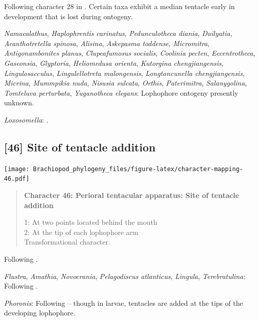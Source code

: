 \documentclass[openany]{book}
\begin{document}
Following character 28 in \citet{Carlson1995Phylogeneticrelationships}.
Certain taxa exhibit a median tentacle early in development that is lost
during ontogeny.

\hypertarget{Acanthotretella_spinosa-coding-45}{}
\emph{Namacalathus}, \emph{Haplophrentis carinatus},
\emph{Pedunculotheca diania}, \emph{Dailyatia}, \emph{Acanthotretella
spinosa}, \emph{Alisina}, \emph{Askepasma toddense}, \emph{Micromitra},
\emph{Antigonambonites planus}, \emph{Clupeafumosus socialis},
\emph{Coolinia pecten}, \emph{Eccentrotheca}, \emph{Gasconsia},
\emph{Glyptoria}, \emph{Heliomedusa orienta}, \emph{Kutorgina
chengjiangensis}, \emph{Lingulosacculus}, \emph{Lingulellotreta
malongensis}, \emph{Longtancunella chengjiangensis}, \emph{Micrina},
\emph{Mummpikia nuda}, \emph{Nisusia sulcata}, \emph{Orthis},
\emph{Paterimitra}, \emph{Salanygolina}, \emph{Tomteluva perturbata},
\emph{Yuganotheca elegans}: Lophophore ontogeny presently unknown.

\hypertarget{Loxosomella-coding-45}{}
\emph{Loxosomella}: \citet{Nielsen1966}.

\subsection*{{[}46{]} Site of tentacle
addition}\label{site-of-tentacle-addition}

\texttt{[image: Brachiopod\_phylogeny\_files/figure-latex/character-mapping-46.pdf]}

\begin{quote}
\textbf{Character 46: Perioral tentacular apparatus: Site of tentacle
addition}

1: At two points located behind the mouth\\
2: At the tip of each lophophore arm\\
Transformational character.
\end{quote}

Following \citet{Temereva2017Innervationof}.

\hypertarget{Amathia-coding-46}{}
\emph{Flustra}, \emph{Amathia}, \emph{Novocrania}, \emph{Pelagodiscus
atlanticus}, \emph{Lingula}, \emph{Terebratulina}: Following
\citet{Temereva2017Innervationof}.

\hypertarget{Phoronis-coding-46}{}
\emph{Phoronis}: Following \citet{Temereva2017Innervationof} -- though
in larvae, tentacles are added at the tips of the developing lophophore.
\end{document}

